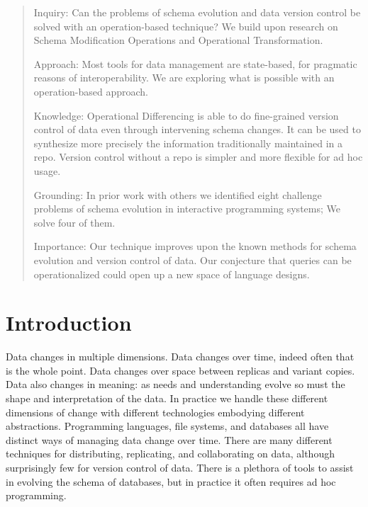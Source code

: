 \documentclass[english,submission]{programming}
\theoremstyle{definition}
\begin{document}
\begin{abstract}
Inquiry: Can the problems of schema evolution and data version control be solved with an operation-based technique? We build upon research on Schema Modification Operations and Operational Transformation.

Approach: Most tools for data management are state-based, for pragmatic reasons of interoperability. We are exploring what is possible with an operation-based approach.

Knowledge: Operational Differencing is able to do fine-grained version control of data even through intervening schema changes. It can be used to synthesize more precisely the information traditionally maintained in a repo. Version control without a repo is simpler and more flexible for ad hoc usage.

Grounding: In prior work with others we identified eight challenge problems of schema evolution in interactive programming systems; We solve four of them.

Importance: Our technique improves upon the known methods for schema evolution and version control of data. Our conjecture that queries can be operationalized could open up a new space of language designs.

\end{abstract}



\section{Introduction}

Data changes in multiple dimensions. Data changes over time, indeed often that is the whole point. Data changes over space between replicas and variant copies. Data also changes in meaning: as needs and understanding evolve so must the shape and interpretation of the data. In practice we handle these different dimensions of change with different technologies embodying different abstractions. Programming languages, file systems, and databases all have distinct ways of managing data change over time. There are many different techniques for distributing, replicating, and collaborating on data, although surprisingly few for version control of data. There is a plethora of tools to assist in evolving the schema of databases, but in practice it often requires ad hoc programming.
\end{document}

